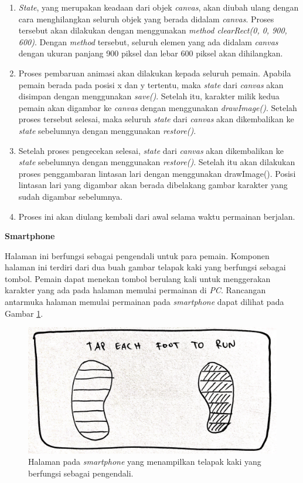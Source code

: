 \begin{enumerate}
\begin{enumerate}
		\item \textit{State}, yang merupakan keadaan dari objek \textit{canvas}, akan diubah ulang dengan cara menghilangkan seluruh objek yang berada didalam \textit{canvas}. Proses tersebut akan dilakukan dengan menggunakan \textit{method clearRect(0, 0, 900, 600)}. Dengan \textit{method} tersebut, seluruh elemen yang ada didalam \textit{canvas} dengan ukuran panjang 900 piksel dan lebar 600 piksel akan dihilangkan.  
		
		\item Proses pembaruan animasi akan dilakukan kepada seluruh pemain. Apabila pemain berada pada posisi x dan y tertentu, maka \textit{state} dari \textit{canvas} akan disimpan dengan menggunakan \textit{save()}. Setelah itu, karakter milik kedua pemain akan digambar ke \textit{canvas} dengan menggunakan \textit{drawImage()}. Setelah proses tersebut selesai, maka seluruh \textit{state} dari \textit{canvas} akan dikembalikan ke \textit{state} sebelumnya dengan menggunakan \textit{restore()}.
		
		\item Setelah proses pengecekan selesai, \textit{state} dari \textit{canvas} akan dikembalikan ke \textit{state} sebelumnya dengan menggunakan \textit{restore()}. Setelah itu akan dilakukan proses penggambaran lintasan lari dengan menggunakan drawImage(). Posisi lintasan lari yang digambar akan berada dibelakang gambar karakter yang sudah digambar sebelumnya. 
		
		\item Proses ini akan diulang kembali dari awal selama waktu permainan berjalan.
	\end{enumerate}

	\textbf{Smartphone}
	
	Halaman ini berfungsi sebagai pengendali untuk para pemain. Komponen halaman ini terdiri dari dua buah gambar telapak kaki yang berfungsi sebagai tombol. Pemain dapat menekan tombol berulang kali untuk menggerakan karakter yang ada pada halaman memulai permainan di \textit{PC}. Rancangan antarmuka halaman memulai permainan pada \textit{smartphone} dapat dilihat pada Gambar \ref{fig:mob5_play}.
	
\begin{figure}[H]
	\centering
	\includegraphics[scale=0.1]{Gambar/mob5_play}
	\caption{Halaman pada \textit{smartphone} yang menampilkan telapak kaki yang berfungsi sebagai pengendali.}
	\label{fig:mob5_play}
\end{figure}


\end{enumerate}
